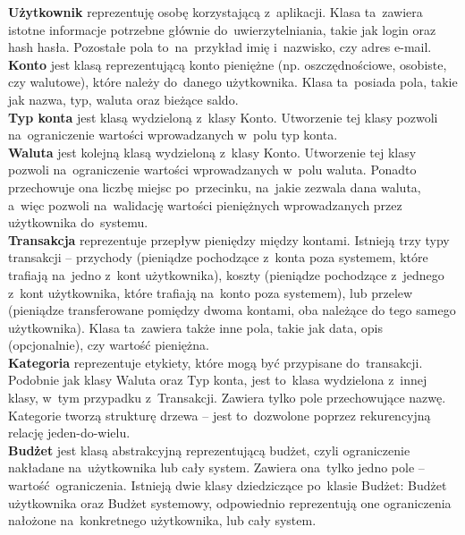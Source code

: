 \textbf{Użytkownik} reprezentuję osobę korzystającą z~aplikacji. Klasa ta~zawiera istotne informacje potrzebne głównie do~uwierzytelniania, takie jak login oraz hash hasła. Pozostałe pola to~na~przykład imię i~nazwisko, czy adres e-mail.\\

\textbf{Konto} jest klasą reprezentującą konto pieniężne (np. oszczędnościowe, osobiste, czy walutowe), które należy do~danego użytkownika. Klasa ta~posiada pola, takie jak nazwa, typ, waluta oraz bieżące saldo.\\

\textbf{Typ konta} jest klasą wydzieloną z~klasy Konto. Utworzenie tej klasy pozwoli na~ograniczenie wartości wprowadzanych w~polu typ konta.\\

\textbf{Waluta} jest kolejną klasą wydzieloną z~klasy Konto. Utworzenie tej klasy pozwoli na~ograniczenie wartości wprowadzanych w~polu waluta. Ponadto przechowuje ona liczbę miejsc po~przecinku, na~jakie zezwala dana waluta, a~więc pozwoli na~walidację wartości pieniężnych wprowadzanych przez użytkownika do~systemu.\\

\textbf{Transakcja} reprezentuje przepływ pieniędzy między kontami. Istnieją trzy typy transakcji -- przychody (pieniądze pochodzące z~konta poza systemem, które trafiają na~jedno z~kont użytkownika), koszty (pieniądze pochodzące z~jednego z~kont użytkownika, które trafiają na~konto poza systemem), lub przelew (pieniądze transferowane pomiędzy dwoma kontami, oba należące do tego samego użytkownika). Klasa ta~zawiera także inne pola, takie jak data, opis (opcjonalnie), czy wartość pieniężna.\\

\textbf{Kategoria} reprezentuje etykiety, które mogą być przypisane do~transakcji. Podobnie jak klasy Waluta oraz Typ konta, jest to~klasa wydzielona z~innej klasy, w~tym przypadku z~Transakcji. Zawiera tylko pole przechowujące nazwę. Kategorie tworzą strukturę drzewa -- jest to~dozwolone poprzez rekurencyjną relację jeden-do-wielu.\\

\textbf{Budżet} jest klasą abstrakcyjną reprezentującą budżet, czyli ograniczenie nakładane na~użytkownika lub cały system. Zawiera ona~tylko jedno pole -- wartość ograniczenia. Istnieją dwie klasy dziedziczące po~klasie Budżet: Budżet użytkownika oraz Budżet systemowy, odpowiednio reprezentują one ograniczenia nałożone na~konkretnego użytkownika, lub cały system.\\
